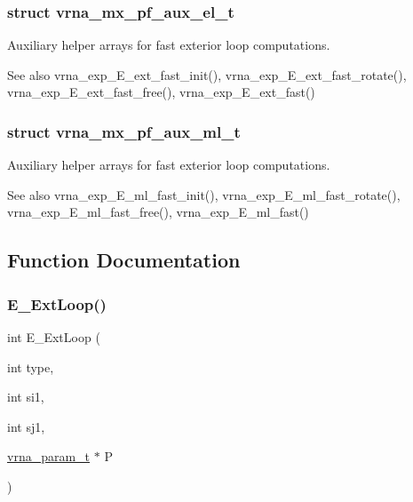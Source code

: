 \subsubsection{struct vrna\+\_\+mx\+\_\+pf\+\_\+aux\+\_\+el\+\_\+t}
Auxiliary helper arrays for fast exterior loop computations. 

\begin{DoxySeeAlso}{See also}
vrna\+\_\+exp\+\_\+\+E\+\_\+ext\+\_\+fast\+\_\+init(), vrna\+\_\+exp\+\_\+\+E\+\_\+ext\+\_\+fast\+\_\+rotate(), vrna\+\_\+exp\+\_\+\+E\+\_\+ext\+\_\+fast\+\_\+free(), vrna\+\_\+exp\+\_\+\+E\+\_\+ext\+\_\+fast() 
\end{DoxySeeAlso}
\label{structvrna__mx__pf__aux__ml__t}
\subsubsection{struct vrna\+\_\+mx\+\_\+pf\+\_\+aux\+\_\+ml\+\_\+t}
Auxiliary helper arrays for fast exterior loop computations. 

\begin{DoxySeeAlso}{See also}
vrna\+\_\+exp\+\_\+\+E\+\_\+ml\+\_\+fast\+\_\+init(), vrna\+\_\+exp\+\_\+\+E\+\_\+ml\+\_\+fast\+\_\+rotate(), vrna\+\_\+exp\+\_\+\+E\+\_\+ml\+\_\+fast\+\_\+free(), vrna\+\_\+exp\+\_\+\+E\+\_\+ml\+\_\+fast() 
\end{DoxySeeAlso}


\subsection{Function Documentation}
\mbox{\label{group__loops_ga05c6288c5a79d3bd5ad6d33c1bb34bd0}} 
\subsubsection{\texorpdfstring{E\+\_\+\+Ext\+Loop()}{E\_ExtLoop()}}
{\footnotesize\ttfamily int E\+\_\+\+Ext\+Loop (\begin{DoxyParamCaption}\item[{int}]{type,  }\item[{int}]{si1,  }\item[{int}]{sj1,  }\item[{\hyperlink{group__energy__parameters_ga8a69ca7d787e4fd6079914f5343a1f35}{vrna\+\_\+param\+\_\+t} $\ast$}]{P }\end{DoxyParamCaption})}



